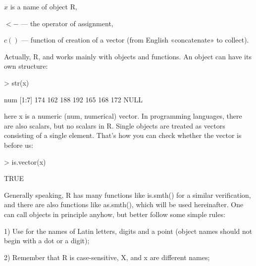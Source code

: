 \documentclass[a4paper,11pt]{scrartcl}
\begin{document}
\(x\) is a name of object R,

\(<-\) — the operator of assignment,

\(c()\) — function of creation of a vector (from English «concatenate» to collect).

Actually, R, and works mainly with objects and functions. An object can have its own structure:

\begin{Schunk}
\begin{Sinput}
> str(x)
\end{Sinput}
\begin{Soutput}
 num [1:7] 174 162 188 192 165 168 172
NULL
\end{Soutput}
\end{Schunk}
here x  is a numeric (num, numerical) vector. In programming languages, there are also scalars, but no scalars in R. Single objects are treated as vectors consisting of a single element.
That's how you can check whether the vector is before us:


\begin{Schunk}
\begin{Sinput}
> is.vector(x)
\end{Sinput}
\begin{Soutput}
[1] TRUE
\end{Soutput}
\end{Schunk}







Generally speaking, R has many functions like is.smth() for a similar verification, and there are also functions like as.smth(), which will be used hereinafter. One can call objects in principle anyhow, but better follow some simple rules:

1) Use for the names of Latin letters, digits and a point (object names should not begin with a dot or a digit);

2) Remember that R is case-sensitive, X, and x are different names;
\end{document}

